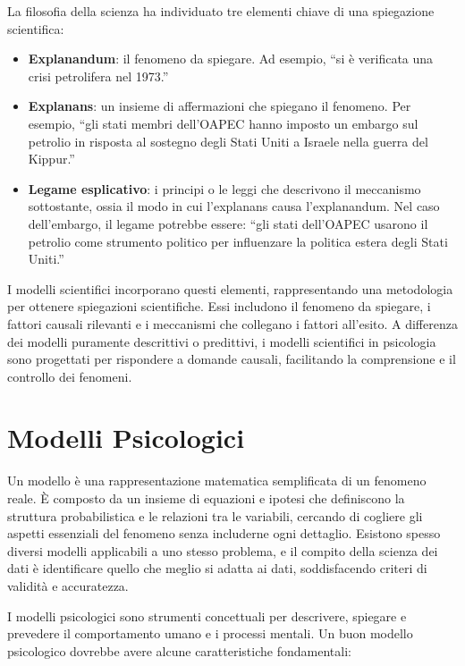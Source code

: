 \documentclass[
  letterpaper,
  DIV=11,
  numbers=noendperiod]{scrreprt}
\providecommand{\tightlist}{%
  \setlength{\itemsep}{0pt}\setlength{\parskip}{0pt}}\usepackage{longtable,booktabs,array}
\theoremstyle{definition}
\theoremstyle{remark}
\begin{document}
La filosofia della scienza ha individuato tre elementi chiave di una
spiegazione scientifica:

\begin{itemize}
\tightlist
\item
  \textbf{Explanandum}: il fenomeno da spiegare. Ad esempio, ``si è
  verificata una crisi petrolifera nel 1973.''
\item
  \textbf{Explanans}: un insieme di affermazioni che spiegano il
  fenomeno. Per esempio, ``gli stati membri dell'OAPEC hanno imposto un
  embargo sul petrolio in risposta al sostegno degli Stati Uniti a
  Israele nella guerra del Kippur.''
\item
  \textbf{Legame esplicativo}: i principi o le leggi che descrivono il
  meccanismo sottostante, ossia il modo in cui l'explanans causa
  l'explanandum. Nel caso dell'embargo, il legame potrebbe essere: ``gli
  stati dell'OAPEC usarono il petrolio come strumento politico per
  influenzare la politica estera degli Stati Uniti.''
\end{itemize}

I modelli scientifici incorporano questi elementi, rappresentando una
metodologia per ottenere spiegazioni scientifiche. Essi includono il
fenomeno da spiegare, i fattori causali rilevanti e i meccanismi che
collegano i fattori all'esito. A differenza dei modelli puramente
descrittivi o predittivi, i modelli scientifici in psicologia sono
progettati per rispondere a domande causali, facilitando la comprensione
e il controllo dei fenomeni.

\section{Modelli Psicologici}\label{modelli-psicologici}

Un modello è una rappresentazione matematica semplificata di un fenomeno
reale. È composto da un insieme di equazioni e ipotesi che definiscono
la struttura probabilistica e le relazioni tra le variabili, cercando di
cogliere gli aspetti essenziali del fenomeno senza includerne ogni
dettaglio. Esistono spesso diversi modelli applicabili a uno stesso
problema, e il compito della scienza dei dati è identificare quello che
meglio si adatta ai dati, soddisfacendo criteri di validità e
accuratezza.

I modelli psicologici sono strumenti concettuali per descrivere,
spiegare e prevedere il comportamento umano e i processi mentali. Un
buon modello psicologico dovrebbe avere alcune caratteristiche
fondamentali:
\end{document}
